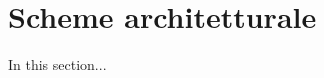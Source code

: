 \section{Scheme architetturale}
\label{sec:chapter_architettura_sistema_schema_architetturale}

In this section...